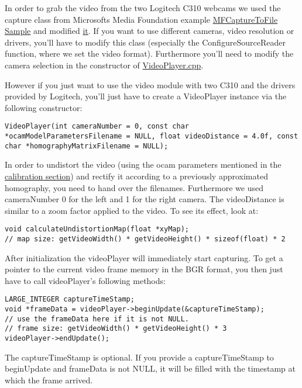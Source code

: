 In order to grab the video from the two Logitech C310 webcams we used the capture
class from Microsofts Media Foundation example
\href{https://msdn.microsoft.com/en-us/library/windows/desktop/ee663604\%28v=vs.85\%29.aspx}{MFCaptureToFile Sample}\cite{mfcapturetofile}
and modified
\href{https://github.com/ands/OculusMeetsAR/blob/master/ARLib/src/Video/CCapture.cpp}{it}.
If you want to use different cameras, video resolution or drivers,
you'll have to modify this class (especially the ConfigureSourceReader
function, where we set the video format). Furthermore you'll need to
modify the camera selection in the constructor of
\href{https://github.com/ands/OculusMeetsAR/blob/master/ARLib/src/Video/videoplayer.cpp}{VideoPlayer.cpp}.

However if you just want to use the video module with two C310\cite{c310} and the
drivers provided by Logitech, you'll just have to create a VideoPlayer
instance via the following constructor:
\begin{lstlisting}
VideoPlayer(int cameraNumber = 0, const char *ocamModelParametersFilename = NULL, float videoDistance = 4.0f, const char *homographyMatrixFilename = NULL);
\end{lstlisting}
In order to undistort the video (using the ocam parameters mentioned in
the \hyperref[sec:stereo_calibration]{calibration section}) and rectify it according to a previously approximated homography, you need to hand over the filenames. Furthermore we used cameraNumber 0 for the left and 1 for the right camera. The videoDistance is similar to a zoom factor applied to the video. To see its effect, look at:
\begin{lstlisting}
void calculateUndistortionMap(float *xyMap);
// map size: getVideoWidth() * getVideoHeight() * sizeof(float) * 2
\end{lstlisting}

After initialization the videoPlayer will immediately start capturing.
To get a pointer to the current video frame memory in the BGR format, you then just have to call videoPlayer's following methods:
\begin{lstlisting}
LARGE_INTEGER captureTimeStamp;
void *frameData = videoPlayer->beginUpdate(&captureTimeStamp);
// use the frameData here if it is not NULL.
// frame size: getVideoWidth() * getVideoHeight() * 3
videoPlayer->endUpdate();
\end{lstlisting}
The captureTimeStamp is optional. If you provide a captureTimeStamp to beginUpdate and frameData is not NULL, it will be filled with the timestamp at which the frame arrived.


